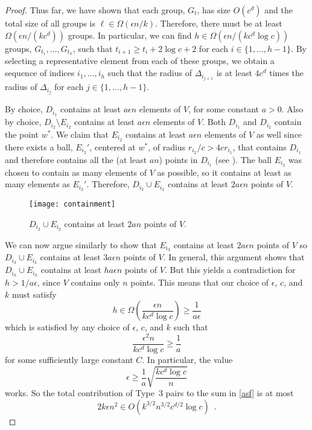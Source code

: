 \documentclass{patmorin}
\begin{document}
\begin{proof}
  Thus far, we have shown that each group, $G_t$, has size $O(c^d)$
  and the total size of all groups is $\ell\in\Omega(\epsilon n/k)$.
  Therefore, there must be at least $\Omega(\epsilon n/(kc^d))$ groups.
  In particular, we can find $h\in\Omega(\epsilon n/(kc^d\log c))$ groups,
  $G_{t_1},\ldots,G_{t_h}$, such that $t_{i+1} \ge t_{i}+2\log c+2$ for
  each $i\in\{1,\ldots,h-1\}$.  By selecting a representative element from
  each of these groups, we obtain a sequence of indices $i_1,\ldots,i_h$
  such that the radius of $\Delta_{i_{j+1}}$ is at least $4c^d$ times
  the radius of $\Delta_{i_j}$ for each $j\in\{1,\ldots,h-1\}$.

  By choice, $D_{i_1}$ contains at least $ a \epsilon n$ elements of
  $V$, for some constant $ a  >0$.  Also by choice, $D_{i_2}\setminus
  E_{i_2}$ contains at least $ a \epsilon n$ elements of $V$.
  Both $D_{i_1}$ and $D_{i_2}$ contain the point $w^*$.  We claim
  that $E_{i_2}$ contains at least $ a \epsilon n$ elements of $V$
  as well since there exists a ball, $E_{i_2}'$, centered at $w^*$,
  of radius $r_{i_2}/c > 4cr_{i_1}$, that contains $D_{i_1}$ and
  therefore contains all the (at least $ a  n$) points in $D_{i_1}$
  (see ).  The ball $E_{i_2}$ was chosen to contain
  as many elements of $V$ as possible, so it contains at least as many
  elements as $E_{i_2}'$.  Therefore, $D_{i_2}\cup E_{i_2}$ contains at
  least $2 a  \epsilon n$ points of $V$.

  \begin{figure}
     \begin{center}
       \texttt{[image: containment]}
     \end{center}
     \caption{$D_{i_2}\cup E_{i_2}$ contains at least $2 a  n$ 
              points of $V$.}
   \end{figure}

  We can now argue similarly to show that $E_{i_3}$ contains at
  least $2 a \epsilon n$ points of $V$ so $D_{i_3}\cup E_{i_3}$
  contains at least $3 a \epsilon n$ points of $V$.  In general,
  this argument shows that $D_{i_h}\cup E_{i_h}$ contains at least
  $h a \epsilon n$ points of $V$.  But this yields a contradiction for
  $h> 1/ a \epsilon$, since $V$ contains only $n$ points.  This means
  that our choice of $\epsilon$, $c$, and $k$ must satisfy
  \[
       h\in\Omega\left(\frac{\epsilon n}{kc^d\log c}\right) \ge
          \frac{1}{ a  \epsilon}
  \]
  which is satisfied by any choice of $\epsilon$, $c$, and $k$ such that
  \[
       \frac{\epsilon^2 n}{kc^d\log c} \ge \frac{1}{a}
  \]
  for some sufficiently large constant $C$.  In particular, the value
  \[
       \epsilon \ge \frac{1}{a}\sqrt{\frac{kc^d\log c}{n}}
  \]
  works.
  So the total contribution of Type~3 pairs to the sum in \eqref{asf}
  is at most
  \[
    2k\epsilon n^2 \in O(k^{3/2}n^{3/2}c^{d/2}\log c) \enspace .
  \]


\end{proof}
\end{document}
